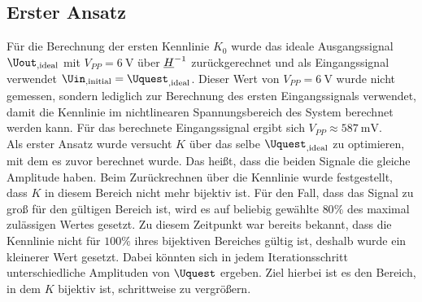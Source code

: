 \documentclass[../Report.tex]{subfiles}
\begin{document}
\subsection{Erster Ansatz}
\label{subsec:opt.adjusta.results}
Für die Berechnung der ersten Kennlinie $K_0$ wurde das ideale Ausgangssignal $\Uout_{, \mathrm{ideal}}$ mit $V_{PP} = \SI{6}{\V}$ über $\underline{H}^{-1}$ zurückgerechnet und als Eingangssignal verwendet $\Uin_{, \mathrm{initial }} = \Uquest_{, \mathrm{ideal}}$. Dieser Wert von $V_{PP} = \SI{6}{\V}$ wurde nicht gemessen, sondern lediglich zur Berechnung des ersten Eingangssignals verwendet, damit die Kennlinie im nichtlinearen Spannungsbereich des System berechnet werden kann. Für das berechnete Eingangssignal ergibt sich $V_{PP} \approx \SI{587}{\mV}$.\\
Als erster Ansatz wurde versucht $K$ über das selbe $\Uquest_{, \mathrm{ideal}}$ zu optimieren, mit dem es zuvor berechnet wurde. Das heißt, dass die beiden Signale die gleiche Amplitude haben. Beim Zurückrechnen über die Kennlinie wurde festgestellt, dass $K$ in diesem Bereich nicht mehr bijektiv ist. Für den Fall, dass das Signal zu groß für den gültigen Bereich ist, wird es auf beliebig gewählte $80\%$ des maximal zulässigen Wertes gesetzt. Zu diesem Zeitpunkt war bereits bekannt, dass die Kennlinie nicht für $100\%$ ihres bijektiven Bereiches gültig ist, deshalb wurde ein kleinerer Wert gesetzt. Dabei könnten sich in jedem Iterationsschritt unterschiedliche Amplituden von $\Uquest$ ergeben. Ziel hierbei ist es den Bereich, in dem $K$ bijektiv ist, schrittweise zu vergrößern.
\end{document}
